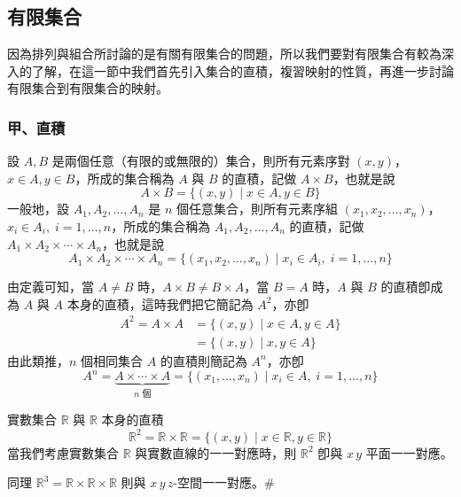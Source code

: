 \subsection{有限集合}\label{sec:b5s-2-1}

因為排列與組合所討論的是有關有限集合的問題，所以我們要對有限集合有較為深入的了解，在這一節中我們首先引入集合的直積，複習映射的性質，再進一步討論有限集合到有限集合的映射。

\subsubsection*{甲、直積}

\begin{definition*}
設 $A, B$ 是兩個任意（有限的或無限的）集合，則所有元素序對 $(x, y)$，$x \in A, y \in B$，所成的集合稱為 $A$ 與 $B$ 的直積，記做 $A \times B$，也就是說
\[
A \times B = \{(x, y) \mid x \in A, y \in B\}
\]
一般地，設 $A_1, A_2, \ldots, A_n$ 是 $n$ 個任意集合，則所有元素序組 $(x_1, x_2, \ldots, x_n)$，$x_i \in A_i,\; i = 1, \ldots, n$，所成的集合稱為 $A_1, A_2, \ldots, A_n$ 的直積，記做 $A_1 \times A_2 \times \cdots \times A_n$，也就是說
\[
A_1 \times A_2 \times \cdots \times A_n = \{(x_1, x_2, \ldots, x_n) \mid x_i \in A_i,\; i = 1, \ldots, n\}
\]
\end{definition*}
由定義可知，當 $A \ne B$ 時，$A \times B \ne B \times A$，當 $B = A$ 時，$A$ 與 $B$ 的直積卽成為 $A$ 與 $A$ 本身的直積，這時我們把它簡記為 $A^2$，亦卽
\begin{align*}
A^2 = A \times A &= \{(x, y) \mid x \in A, y \in A\} \\
&= \{(x, y) \mid x, y \in A\}
\end{align*}
由此類推，$n$ 個相同集合 $A$ 的直積則簡記為 $A^n$，亦卽
\[
A^n = \underbrace{A \times \cdots \times A}_{n\text{ 個}} = \{(x_1, \ldots, x_n) \mid x_i \in A,\; i = 1, \ldots, n\}
\]

\medskip
\begin{example}\label{ex:b5s-2-1}
實數集合 $\mathbb{R}$ 與 $\mathbb{R}$ 本身的直積
\[
\mathbb{R}^2 = \mathbb{R} \times \mathbb{R} = \{(x, y) \mid x \in \mathbb{R}, y \in \mathbb{R}\}
\]
當我們考慮實數集合 $\mathbb{R}$ 與實數直線的一一對應時，則 $\mathbb{R}^2$ 卽與 $x\,y$ 平面一一對應。

同理 $\mathbb{R}^3 = \mathbb{R} \times \mathbb{R} \times \mathbb{R}$ 則與 $x\,y\,z$-空間一一對應。\hfill $\#$
\end{example}

